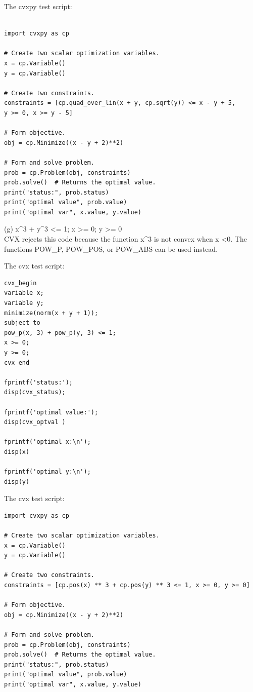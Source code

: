 \documentclass{article}
\begin{document}
The cvxpy test script:\\
\begin{verbatim}

import cvxpy as cp

# Create two scalar optimization variables.
x = cp.Variable()
y = cp.Variable()

# Create two constraints.
constraints = [cp.quad_over_lin(x + y, cp.sqrt(y)) <= x - y + 5, 
y >= 0, x >= y - 5]

# Form objective.
obj = cp.Minimize((x - y + 2)**2)

# Form and solve problem.
prob = cp.Problem(obj, constraints)
prob.solve()  # Returns the optimal value.
print("status:", prob.status)
print("optimal value", prob.value)
print("optimal var", x.value, y.value)
\end{verbatim}

(g) x\^{}3 + y\^{}3 <= 1; x \textgreater= 0; y \textgreater= 0\\
CVX rejects this code because the function  x\^{}3 is not convex when  x \textless 0. The functions POW\_P, POW\_POS, or POW\_ABS can be used instead.

The cvx test script:\\
\begin{verbatim}
cvx_begin
variable x;
variable y;
minimize(norm(x + y + 1));
subject to
pow_p(x, 3) + pow_p(y, 3) <= 1;
x >= 0;
y >= 0;
cvx_end

fprintf('status:'); 
disp(cvx_status);

fprintf('optimal value:'); 
disp(cvx_optval )

fprintf('optimal x:\n'); 
disp(x)

fprintf('optimal y:\n'); 
disp(y)
\end{verbatim}

The cvx test script:\\
\begin{verbatim}
import cvxpy as cp

# Create two scalar optimization variables.
x = cp.Variable()
y = cp.Variable()

# Create two constraints.
constraints = [cp.pos(x) ** 3 + cp.pos(y) ** 3 <= 1, x >= 0, y >= 0]

# Form objective.
obj = cp.Minimize((x - y + 2)**2)

# Form and solve problem.
prob = cp.Problem(obj, constraints)
prob.solve()  # Returns the optimal value.
print("status:", prob.status)
print("optimal value", prob.value)
print("optimal var", x.value, y.value)
\end{verbatim}
\end{document}
